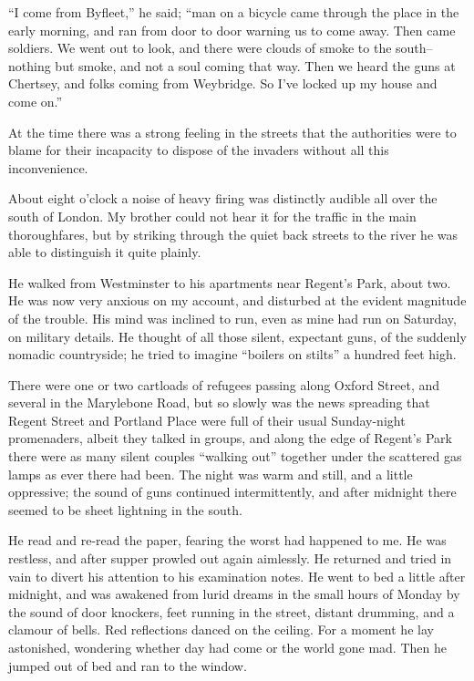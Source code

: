 ``I come from Byfleet,'' he said; ``man on a bicycle came through the
place in the early morning, and ran from door to door warning us to
come away. Then came soldiers. We went out to look, and there were
clouds of smoke to the south--nothing but smoke, and not a soul
coming that way. Then we heard the guns at Chertsey, and folks
coming from Weybridge. So I've locked up my house and come on.''

At the time there was a strong feeling in the streets that the
authorities were to blame for their incapacity to dispose of the
invaders without all this inconvenience.

About eight o'clock a noise of heavy firing was distinctly audible
all over the south of London. My brother could not hear it for the
traffic in the main thoroughfares, but by striking through the
quiet back streets to the river he was able to distinguish it quite
plainly.

He walked from Westminster to his apartments near Regent's Park,
about two. He was now very anxious on my account, and disturbed at
the evident magnitude of the trouble. His mind was inclined to run,
even as mine had run on Saturday, on military details. He thought
of all those silent, expectant guns, of the suddenly nomadic
countryside; he tried to imagine ``boilers on stilts'' a hundred feet
high.

There were one or two cartloads of refugees passing along Oxford
Street, and several in the Marylebone Road, but so slowly was the
news spreading that Regent Street and Portland Place were full of
their usual Sunday-night promenaders, albeit they talked in groups,
and along the edge of Regent's Park there were as many silent
couples ``walking out'' together under the scattered gas lamps as
ever there had been. The night was warm and still, and a little
oppressive; the sound of guns continued intermittently, and after
midnight there seemed to be sheet lightning in the south.

He read and re-read the paper, fearing the worst had happened to
me. He was restless, and after supper prowled out again aimlessly.
He returned and tried in vain to divert his attention to his
examination notes. He went to bed a little after midnight, and was
awakened from lurid dreams in the small hours of Monday by the
sound of door knockers, feet running in the street, distant
drumming, and a clamour of bells. Red reflections danced on the
ceiling. For a moment he lay astonished, wondering whether day had
come or the world gone mad. Then he jumped out of bed and ran to
the window.

